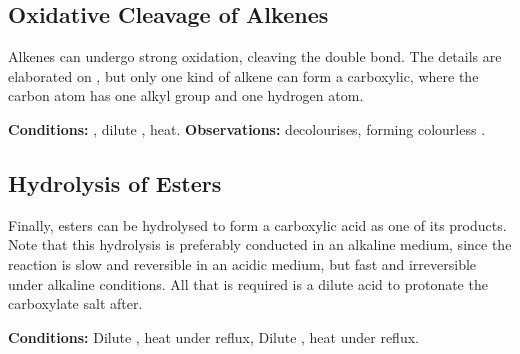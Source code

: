 


		\subsection{Oxidative Cleavage of Alkenes}

			Alkenes can undergo strong oxidation, cleaving the double bond. The details are elaborated on
			\hyperlink{OxidativeCleavageOfAlkenes}{}, but only one kind of alkene can form a carboxylic, where the carbon
			atom has one alkyl group and one hydrogen atom.

			\vspace{1.5em}
			\vbox{\textbf{Conditions:}	\tabto{35mm}, dilute , heat.}
			\vbox{\textbf{Observations:}  decolourises, forming colourless .}





		\pagebreak
		\subsection{Hydrolysis of Esters}

			Finally, esters can be hydrolysed to form a carboxylic acid as one of its products. Note that this hydrolysis is preferably
			conducted in an alkaline medium, since the reaction is slow and reversible in an acidic medium, but fast and irreversible under
			alkaline conditions. All that is required is a dilute acid to protonate the carboxylate salt after.

			\vspace{1.5em}
			\vbox{\textbf{Conditions:}	\tabto{35mm}Dilute , heat under reflux, 
										\tabto{35mm}Dilute , heat under reflux.}

